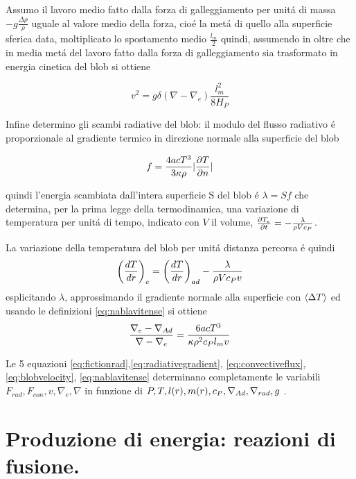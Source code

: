 \documentclass[../main.tex]{subfiles}
\begin{document}
Assumo il lavoro medio fatto dalla forza di galleggiamento per unit\'a di massa $-g\frac{\Delta\rho}{\rho}$ uguale al valore medio della forza, cio\'e la met\'a di quello alla superficie sferica data, moltiplicato lo spostamento medio $\frac{l_m}{2}$ quindi, assumendo in oltre che in media met\'a del lavoro fatto dalla forza di galleggiamento sia trasformato in energia cinetica del blob si ottiene

\begin{equation}
v^2=g\delta(\nabla-\nabla_e)\frac{l_m^2}{8H_P}\label{eq:blobvelocity}
\end{equation}

Infine determino gli scambi radiative del blob: il modulo del flusso radiativo \'e proporzionale al gradiente termico in direzione normale alla superficie del blob

\begin{equation}
f=\frac{4acT^3}{3\kappa\rho}|\PDy{n}{T}|
\end{equation}

quindi l'energia scambiata dall'intera superficie S del blob \'e $\lambda=Sf$ che determina, per la prima legge della termodinamica, una variazione di temperatura per unit\'a di tempo, indicato con $V$ il volume, $\PDy{t}{T_e}=-\frac{\lambda}{\rho Vc_P}$.

La variazione della temperatura del blob per unit\'a distanza percorsa \'e quindi
\begin{equation}
\Dcvar{\TDy{r}{T}}{e}=\Dcvar{\TDy{r}{T}}{ad}-\frac{\lambda}{\rho Vc_Pv}\label{eq:Tchangelength}
\end{equation}
esplicitando $\lambda$, approssimando il gradiente normale alla superficie con $\exv{\Delta T}$ ed usando le definizioni \eqref{eq:nablavitense} si ottiene
\begin{equation}
\frac{\nabla_e-\nad{}}{\nabla-\nabla_e}=\frac{6acT^3}{\kappa\rho^2c_Pl_mv}
\end{equation}

Le 5 equazioni \eqref{eq:fictionrad},\eqref{eq:radiativegradient}, \eqref{eq:convectiveflux}, \eqref{eq:blobvelocity}, \eqref{eq:nablavitense} determinano completamente le variabili $F_{rad}, F_{con}, v, \nabla_e, \nabla$ in funzione di $P,T,l(r),m(r),c_P,\nad{},\nrad{},g$ .


\chapter{Produzione di energia: reazioni di fusione.}
\end{document}

